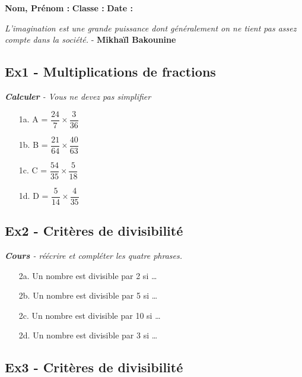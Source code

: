 \documentclass[12pt]{article}
\begin{document}
\textbf{Nom, Prénom :} \hspace{8cm} \textbf{Classe :} \hspace{3cm} \textbf{Date :}\\

\begin{center}
  \textit{L'imagination est une grande puissance dont généralement on ne tient pas assez compte dans la société.}  - \textbf{Mikhaïl Bakounine}
\end{center}

\subsection*{Ex1 - Multiplications de fractions}

\textit{\textbf{Calculer} - Vous ne devez pas simplifier}

\begin{multicols}{4}
  \begin{enumerate}
    \item[1a.] A = $\dfrac{24}{7} \times \dfrac{3}{36}$
    \item[1b.] B = $\dfrac{21}{64} \times \dfrac{40}{63}$
    \item[1c.] C = $\dfrac{54}{35} \times \dfrac{5}{18}$
    \item[1d.] D = $\dfrac{5}{14} \times \dfrac{4}{35}$
  \end{enumerate} 
\end{multicols}
  

\subsection*{Ex2 - Critères de divisibilité}

\textit{\textbf{Cours} - réécrire et compléter les quatre phrases.}

\begin{multicols}{2}
  \begin{enumerate}
    \item[2a.] Un nombre est divisible par  2 si \dots
    \item[2b.] Un nombre est divisible par  5 si \dots
    \item[2c.] Un nombre est divisible par 10 si \dots
    \item[2d.] Un nombre est divisible par  3 si \dots
  \end{enumerate} 
\end{multicols}

\subsection*{Ex3 - Critères de divisibilité}
\end{document}
